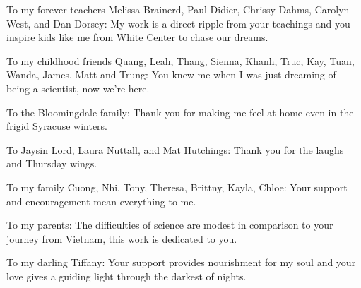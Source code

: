	To my forever teachers Melissa Brainerd, Paul Didier, Chrissy Dahms, Carolyn West, and Dan Dorsey:  My work is a direct ripple from your teachings and you inspire kids like me from White Center to chase our dreams.
	
	To my childhood friends Quang, Leah, Thang, Sienna, Khanh, Truc, Kay, Tuan, Wanda, James, Matt and Trung:  You knew me when I was just dreaming of being a scientist, now we're here.
	
	To the Bloomingdale family: Thank you for making me feel at home even in the frigid Syracuse winters.
	
	To Jaysin Lord, Laura Nuttall, and Mat Hutchings: Thank you for the laughs and Thursday wings.
	
	To my family Cuong, Nhi, Tony, Theresa, Brittny, Kayla, Chloe: Your support and encouragement mean everything to me.
	
	To my parents: The difficulties of science are modest in comparison to your journey from Vietnam, this work is dedicated to you.
	
	To my darling Tiffany: Your support provides nourishment for my soul and your love gives a guiding light through the darkest of nights.